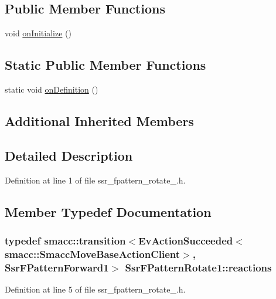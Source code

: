 \subsection*{Public Member Functions}
\begin{DoxyCompactItemize}
\item 
void \hyperlink{structSsrFPatternRotate1_aaf280a67edc0719088176780968dbc01}{on\+Initialize} ()
\end{DoxyCompactItemize}
\subsection*{Static Public Member Functions}
\begin{DoxyCompactItemize}
\item 
static void \hyperlink{structSsrFPatternRotate1_a7c51ce804c50c0a9d87736dd94c1a978}{on\+Definition} ()
\end{DoxyCompactItemize}
\subsection*{Additional Inherited Members}


\subsection{Detailed Description}


Definition at line 1 of file ssr\+\_\+fpattern\+\_\+rotate\+\_.\+h.



\subsection{Member Typedef Documentation}
\subsubsection[{\texorpdfstring{reactions}{reactions}}]{\setlength{\rightskip}{0pt plus 5cm}typedef {\bf smacc\+::transition}$<$Ev\+Action\+Succeeded$<${\bf smacc\+::\+Smacc\+Move\+Base\+Action\+Client}$>$, {\bf Ssr\+F\+Pattern\+Forward1}$>$ {\bf Ssr\+F\+Pattern\+Rotate1\+::reactions}}\hypertarget{structSsrFPatternRotate1_af65def78e3ba069f32f55ef99ed0e658}{}\label{structSsrFPatternRotate1_af65def78e3ba069f32f55ef99ed0e658}


Definition at line 5 of file ssr\+\_\+fpattern\+\_\+rotate\+\_.\+h.



